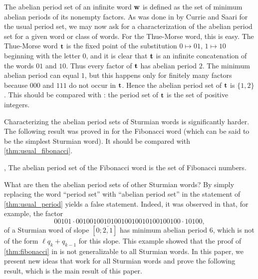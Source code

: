 \documentclass[a4paper,fleqn]{article}
\newcommand{\infw}[1]{%
  \ifcat\noexpand#1\relax\bm{#1}%
  \else\mathbf{#1}\fi}          %
\begin{document}
  The abelian period set of an infinite word $\infw{w}$ is defined as the set of minimum abelian periods of its
  nonempty factors. As was done in \cite{2009:least_periods_of_factors_of_infinite_words} by Currie and Saari for the
  usual period set, we may now ask for a characterization of the abelian period set for a given word or class of words.
  For the Thue-Morse word, this is easy. The Thue-Morse word $\infw{t}$ is the fixed point of the substitution
  $0 \mapsto 01$, $1 \mapsto 10$ beginning with the letter $0$, and it is clear that $\infw{t}$ is an infinite
  concatenation of the words $01$ and $10$. Thus every factor of $\infw{t}$ has abelian period $2$. The minimum abelian
  period can equal $1$, but this happens only for finitely many factors because $000$ and $111$ do not occur in
  $\infw{t}$. Hence the abelian period set of $\infw{t}$ is $\{1, 2\}$. This should be compared with
  \cite[Thm.~2]{2009:least_periods_of_factors_of_infinite_words}: the period set of $\infw{t}$ is the set of positive
  integers.

  Characterizing the abelian period sets of Sturmian words is significantly harder. The following result was proved in
  \cite{2016:abelian_powers_and_repetitions_in_sturmian_words} for the Fibonacci word (which can be said to be the
  simplest Sturmian word). It should be compared with \autoref{thm:usual_fibonacci}.

  \begin{theorem}\label{thm:fibonacci}\cite[Thm.~6.9]{2016:abelian_powers_and_repetitions_in_sturmian_words},\cite[Thm.~6.12]{2016:abelian_powers_and_repetitions_in_sturmian_words}
    The abelian period set of the Fibonacci word is the set of Fibonacci numbers.
  \end{theorem}

  What are then the abelian period sets of other Sturmian words? By simply replacing the word ``period set'' with
  ``abelian period set'' in the statement of \autoref{thm:usual_period} yields a false statement. Indeed, it was
  observed in \cite[Remark~6.11]{2016:abelian_powers_and_repetitions_in_sturmian_words} that, for example, the factor
  \begin{equation*}
    00101 \cdot 001001001010010010010100100100 \cdot 10100,
  \end{equation*}
  of a Sturmian word of slope $[0;\overline{2,1}]$ has minimum abelian period $6$, which is not of the form
  $\ell q_k + q_{k-1}$ for this slope. This example showed that the proof of \autoref{thm:fibonacci} in
  \cite{2016:abelian_powers_and_repetitions_in_sturmian_words} is not generalizable to all Sturmian words. In this
  paper, we present new ideas that work for all Sturmian words and prove the following result, which is the main result
  of this paper.
\end{document}
